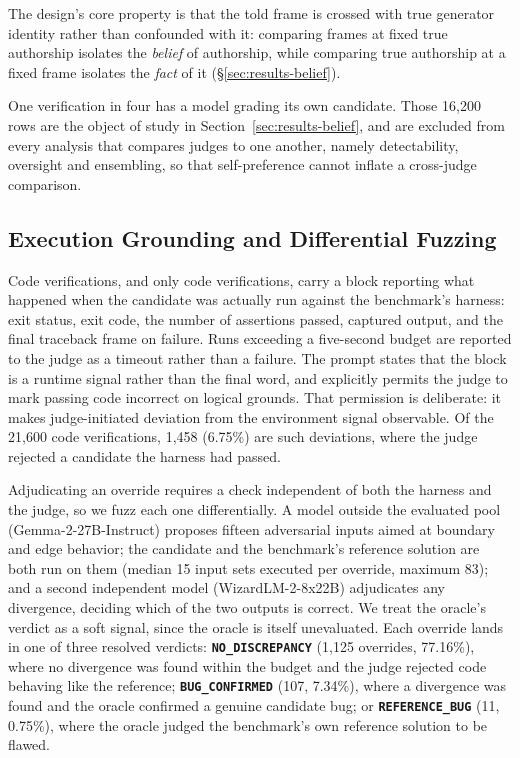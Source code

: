 The design's core property is that the told frame is crossed with true generator identity rather than confounded with it: comparing frames at fixed true authorship isolates the \emph{belief} of authorship, while comparing true authorship at a fixed frame isolates the \emph{fact} of it (\S\ref{sec:results-belief}).

One verification in four has a model grading its own candidate. Those 16{,}200 rows are the
object of study in Section~\ref{sec:results-belief}, and are excluded from every analysis
that compares judges to one another, namely detectability, oversight and ensembling, so
that self-preference cannot inflate a cross-judge comparison.

\subsection{Execution Grounding and Differential Fuzzing}
\label{sec:setup-grounding}

Code verifications, and only code verifications, carry a block reporting what happened when
the candidate was actually run against the benchmark's harness: exit status, exit code, the
number of assertions passed, captured output, and the final traceback frame on failure.
Runs exceeding a five-second budget are reported to the judge as a timeout rather than a
failure. The prompt states that the block is a runtime signal rather than the final word,
and explicitly permits the judge to mark passing code incorrect on logical grounds. That
permission is deliberate: it makes judge-initiated deviation from the environment signal
observable. Of the 21{,}600 code verifications, 1{,}458 (6.75\%) are such deviations, where
the judge rejected a candidate the harness had passed.

Adjudicating an override requires a check independent of both the harness and the judge, so
we fuzz each one differentially. A model outside the evaluated pool
(Gemma-2-27B-Instruct) proposes fifteen adversarial inputs aimed at boundary and edge
behavior; the candidate and the benchmark's reference solution are both run on them (median
15 input sets executed per override, maximum 83); and a second independent model
(WizardLM-2-8x22B) adjudicates any divergence, deciding which of the two outputs is correct.
We treat the oracle's verdict as a soft signal, since the oracle is itself unevaluated.
Each override lands in one of three resolved verdicts: \textbf{\texttt{NO\_DISCREPANCY}} (1{,}125 overrides, 77.16\%), where no divergence was found within the budget and the judge rejected code behaving like the reference; \textbf{\texttt{BUG\_CONFIRMED}} (107, 7.34\%), where a divergence was found and the oracle confirmed a genuine candidate bug; or \textbf{\texttt{REFERENCE\_BUG}} (11, 0.75\%), where the oracle judged the benchmark's own reference solution to be flawed.

